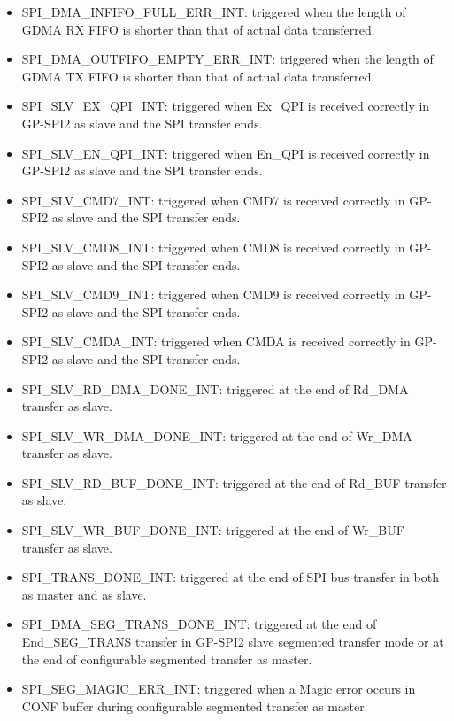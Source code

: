 \documentclass[main\_\_EN.tex]{subfiles}
\begin{document}
\begin{itemize}
\item \label{int:SPIINFIFOFULLERRINT}SPI\_DMA\_INFIFO\_FULL\_ERR\_INT: triggered when the length of GDMA RX FIFO is shorter than that of actual data transferred.
\item \label{int:SPIOUTFIFOEMPTYERRINT}SPI\_DMA\_OUTFIFO\_EMPTY\_ERR\_INT: triggered when the length of GDMA TX FIFO is shorter than that of actual data transferred.

\item \label{int:SPISLVEXQPIINT} SPI\_SLV\_EX\_QPI\_INT: triggered when Ex\_QPI is received correctly in GP-SPI2 as slave and the SPI transfer ends.
\item \label{int:SPISLVENQPIINT} SPI\_SLV\_EN\_QPI\_INT: triggered when En\_QPI is received correctly in GP-SPI2 as slave and the SPI transfer ends.
\item \label{int:SPISLVCMD7INT} SPI\_SLV\_CMD7\_INT: triggered when CMD7 is received correctly in GP-SPI2 as slave and the SPI transfer ends.
\item \label{int:SPISLVCMD8INT} SPI\_SLV\_CMD8\_INT: triggered when CMD8 is received correctly in GP-SPI2 as slave and the SPI transfer ends.
\item \label{int:SPISLVCMD9INT} SPI\_SLV\_CMD9\_INT: triggered when CMD9 is received correctly in GP-SPI2 as slave and the SPI transfer ends.
\item \label{int:SPISLVCMDAINT} SPI\_SLV\_CMDA\_INT: triggered when CMDA is received correctly in GP-SPI2 as slave and the SPI transfer ends.

\item \label{int:SPISLVRDDMADONEINT}SPI\_SLV\_RD\_DMA\_DONE\_INT: triggered at the end of Rd\_DMA transfer as slave.
\item \label{int:SPISLVWRDMADONEINT}SPI\_SLV\_WR\_DMA\_DONE\_INT: triggered at the end of Wr\_DMA transfer as slave.
\item \label{int:SPISLVRDBUFDONEINT}SPI\_SLV\_RD\_BUF\_DONE\_INT: triggered at the end of Rd\_BUF transfer as slave.
\item \label{int:SPISLVWRBUFDONEINT}SPI\_SLV\_WR\_BUF\_DONE\_INT: triggered at the end of Wr\_BUF transfer as slave.

\item \label{int:SPITRANSDONEINT}SPI\_TRANS\_DONE\_INT: triggered at the end of SPI bus transfer in both as master and as slave.
\item \label{int:SPIDMASEGTRANSDONEINT}SPI\_DMA\_SEG\_TRANS\_DONE\_INT: triggered at the end of End\_SEG\_TRANS transfer in GP-SPI2 slave segmented transfer mode or at the end of configurable segmented transfer as master.
\item \label{int:SPISEGMAGICERRINT} SPI\_SEG\_MAGIC\_ERR\_INT: triggered when a Magic error occurs in CONF buffer during configurable segmented transfer as master.



\end{itemize}
\end{document}

